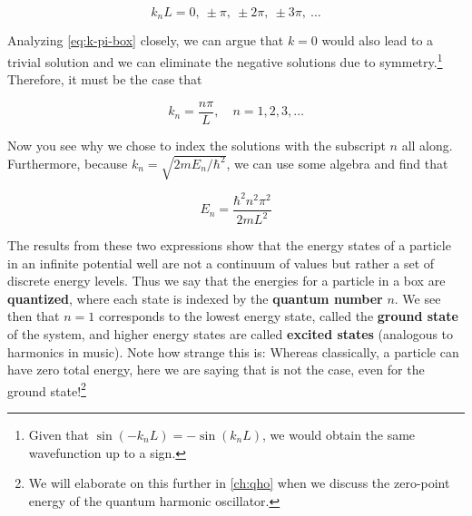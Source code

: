 \begin{equation}
	k_nL = 0,\ \pm\pi,\ \pm2\pi,\ \pm3\pi,\ \dots \label{eq:k-pi-box}
\end{equation}

Analyzing \autoref{eq:k-pi-box} closely, we can argue that $k = 0$ would also lead to a trivial solution and we can eliminate the negative solutions due to symmetry.\footnote{Given that $\sin(-k_nL) = -\sin(k_nL)$, we would obtain the same wavefunction up to a sign.} 
Therefore, it must be the case that 

\begin{tcolorbox}[title=Allowed values of $k$] \vspace{-2ex}
	\begin{equation}
		k_n = \frac{n\pi}{L}, \quad n = 1, 2, 3, \dots   \label{eq:k-box}
	\end{equation}
\end{tcolorbox}

Now you see why we chose to index the solutions with the subscript $n$ all along. 
Furthermore, because $k_n = \sqrt{2mE_n/\hbar^2}$, we can use some algebra and find that

\begin{tcolorbox}[title = Allowed energies] \vspace{-2ex}
	\begin{equation}
		E_n = \frac{\hbar^2n^2\pi^2}{2mL^2} \label{eq:E-box}
	\end{equation}
\end{tcolorbox}

The results from these two expressions show that the energy states of a particle in an infinite potential well are not a continuum of values but rather a set of discrete energy levels. 
Thus we say that the energies for a particle in a box are \textbf{quantized}, where each state is indexed by the \textbf{quantum number} $n$. 
We see then that $n = 1$ corresponds to the lowest energy state, called the \textbf{ground state} of the system, and higher energy states are called \textbf{excited states} (analogous to harmonics in music). 
Note how strange this is: Whereas classically, a particle can have zero total energy, here we are saying that is not the case, even for the ground state!\footnote{We will elaborate on this further in \autoref{ch:qho} when we discuss the zero-point energy of the quantum harmonic oscillator.} 



